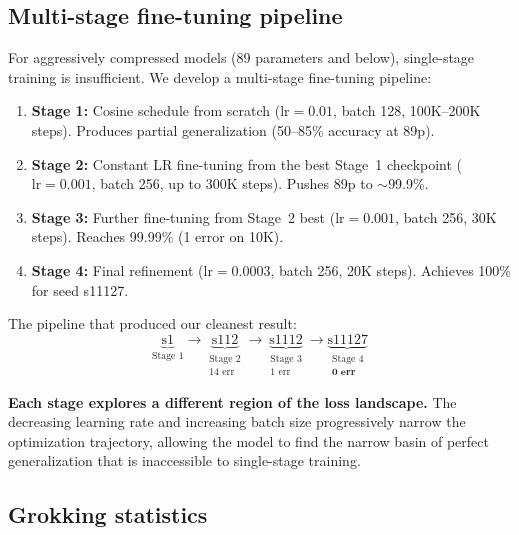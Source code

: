 \documentclass[11pt]{article}
\begin{document}
\subsection{Multi-stage fine-tuning pipeline}

For aggressively compressed models (89 parameters and below), single-stage
training is insufficient. We develop a multi-stage fine-tuning pipeline:

\begin{enumerate}[leftmargin=*, itemsep=2pt]
  \item \textbf{Stage 1:} Cosine schedule from scratch ($\text{lr}=0.01$,
    batch 128, 100K--200K steps). Produces partial generalization
    (50--85\% accuracy at 89p).
  \item \textbf{Stage 2:} Constant LR fine-tuning from the best Stage~1
    checkpoint ($\text{lr}=0.001$, batch 256, up to 300K steps). Pushes
    89p to $\sim$99.9\%.
  \item \textbf{Stage 3:} Further fine-tuning from Stage~2 best
    ($\text{lr}=0.001$, batch 256, 30K steps). Reaches 99.99\% (1 error
    on 10K).
  \item \textbf{Stage 4:} Final refinement ($\text{lr}=0.0003$, batch
    256, 20K steps). Achieves 100\% for seed s11127.
\end{enumerate}

The pipeline that produced our cleanest result:
\[
  \underbrace{\text{s1}}_{\text{Stage 1}} \to
  \underbrace{\text{s112}}_{\substack{\text{Stage 2}\\\text{14 err}}} \to
  \underbrace{\text{s1112}}_{\substack{\text{Stage 3}\\\text{1 err}}} \to
  \underbrace{\text{s11127}}_{\substack{\text{Stage 4}\\\textbf{0 err}}}
\]

\textbf{Each stage explores a different region of the loss landscape.}
The decreasing learning rate and increasing batch size progressively
narrow the optimization trajectory, allowing the model to find the narrow
basin of perfect generalization that is inaccessible to single-stage
training.

\subsection{Grokking statistics}
\end{document}
